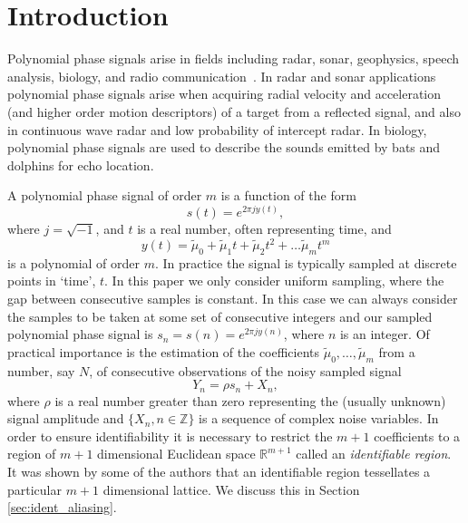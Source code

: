 \documentclass[aap,preprint]{imsart}
\newcommand{\reals}{{\mathbb R}}
\newcommand{\ints}{{\mathbb Z}}
\begin{document}
 



\section{Introduction} \label{intro}

Polynomial phase signals arise in fields including radar, sonar, geophysics, speech analysis, biology, and radio communication~\cite{Hlawatsch_lin_quad_time_freq_spmag_1992,Ridleyspeechpolyphase1989, Suga_1975_bats_echolocation, Moss_2005echolocation}. In radar and sonar applications polynomial phase signals arise when acquiring radial velocity and acceleration (and higher order motion descriptors) of a target from a reflected signal, and also in continuous wave radar and low probability of intercept radar.  In biology, polynomial phase signals are used to describe the sounds emitted by bats and dolphins for echo location.  

A polynomial phase signal of order $m$ is a function of the form
\[
s(t) = e^{2\pi j y(t)},
\]
where $j = \sqrt{-1}$, and $t$ is a real number, often representing time, and 
\[
y(t) = \tilde{\mu}_0 +\tilde{\mu}_1 t + \tilde{\mu}_2 t^2 + \dots \tilde{\mu}_m t^m
\]
is a polynomial of order $m$.  In practice the signal is typically sampled at discrete points in `time', $t$. In this paper we only consider uniform sampling, where the gap between consecutive samples is constant. In this case we can always consider the samples to be taken at some set of consecutive integers and our sampled polynomial phase signal is $s_n = s(n) = e^{2\pi j y(n)}$, where $n$ is an integer.  Of practical importance is the estimation of the coefficients $\tilde{\mu}_0, \dots, \tilde{\mu}_m$ from a number, say $N$, of consecutive observations of the noisy sampled signal
\begin{equation}\label{eq:Y_nsamplednoisey}
Y_n = \rho s_n + X_n,
\end{equation}
where $\rho$ is a real number greater than zero representing the (usually unknown) signal amplitude and $\{X_n, n \in \ints\}$ is a sequence of complex noise variables. In order to ensure identifiability it is necessary to restrict the $m+1$ coefficients to a region of $m+1$ dimensional Euclidean space $\reals^{m+1}$ called an \emph{identifiable region}.  It was shown by some of the authors \cite{McKilliam2009IndentifiabliltyAliasingPolyphase} that an identifiable region tessellates a particular $m+1$ dimensional lattice.  We discuss this in Section \ref{sec:ident_aliasing}.
\end{document}
